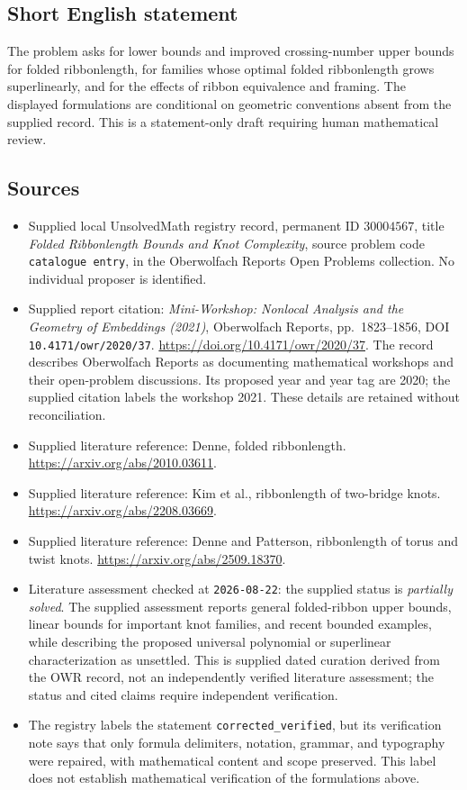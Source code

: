 \documentclass[11pt]{article}
\begin{document}
\subsection{Short English statement}
The problem asks for lower bounds and improved crossing-number upper bounds for folded ribbonlength, for families whose optimal folded ribbonlength grows superlinearly, and for the effects of ribbon equivalence and framing. The displayed formulations are conditional on geometric conventions absent from the supplied record. This is a statement-only draft requiring human mathematical review.
\subsection{Sources}
\begin{itemize}
\item Supplied local UnsolvedMath registry record, permanent ID \(30004567\), title \emph{Folded Ribbonlength Bounds and Knot Complexity}, source problem code \texttt{catalogue entry}, in the Oberwolfach Reports Open Problems collection. No individual proposer is identified.
\item Supplied report citation: \emph{Mini-Workshop: Nonlocal Analysis and the Geometry of Embeddings (2021)}, Oberwolfach Reports, pp.\ 1823--1856, DOI \texttt{10.4171/owr/2020/37}. \url{https://doi.org/10.4171/owr/2020/37}. The record describes Oberwolfach Reports as documenting mathematical workshops and their open-problem discussions. Its proposed year and year tag are 2020; the supplied citation labels the workshop 2021. These details are retained without reconciliation.
\item Supplied literature reference: Denne, folded ribbonlength. \url{https://arxiv.org/abs/2010.03611}.
\item Supplied literature reference: Kim et al., ribbonlength of two-bridge knots. \url{https://arxiv.org/abs/2208.03669}.
\item Supplied literature reference: Denne and Patterson, ribbonlength of torus and twist knots. \url{https://arxiv.org/abs/2509.18370}.
\item Literature assessment checked at \texttt{2026-08-22}: the supplied status is \emph{partially solved}. The supplied assessment reports general folded-ribbon upper bounds, linear bounds for important knot families, and recent bounded examples, while describing the proposed universal polynomial or superlinear characterization as unsettled. This is supplied dated curation derived from the OWR record, not an independently verified literature assessment; the status and cited claims require independent verification.
\item The registry labels the statement \texttt{corrected\_verified}, but its verification note says that only formula delimiters, notation, grammar, and typography were repaired, with mathematical content and scope preserved. This label does not establish mathematical verification of the formulations above.
\end{itemize}
\end{document}
